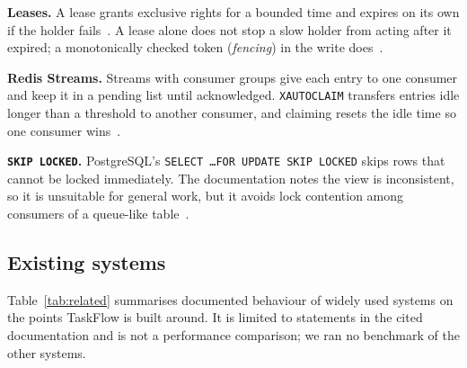 \documentclass[conference]{IEEEtran}
\newcommand{\code}[1]{\texttt{\small #1}}
\begin{document}
\textbf{Leases.} A lease grants exclusive rights for a bounded time and expires on its own if the holder fails~\cite{gray1989leases}. A lease alone does not stop a slow holder from acting after it expired; a monotonically checked token (\emph{fencing}) in the write does~\cite{kleppmann2017ddia}.

\textbf{Redis Streams.} Streams with consumer groups give each entry to one consumer and keep it in a pending list until acknowledged. \code{XAUTOCLAIM} transfers entries idle longer than a threshold to another consumer, and claiming resets the idle time so one consumer wins~\cite{redisstreams,redisxautoclaim}.

\textbf{\code{SKIP LOCKED}.} PostgreSQL's \code{SELECT \ldots FOR UPDATE SKIP LOCKED} skips rows that cannot be locked immediately. The documentation notes the view is inconsistent, so it is unsuitable for general work, but it avoids lock contention among consumers of a queue-like table~\cite{pgselect}.

\subsection{Existing systems}
Table~\ref{tab:related} summarises documented behaviour of widely used systems on the points TaskFlow is built around. It is limited to statements in the cited documentation and is not a performance comparison; we ran no benchmark of the other systems.
\end{document}
